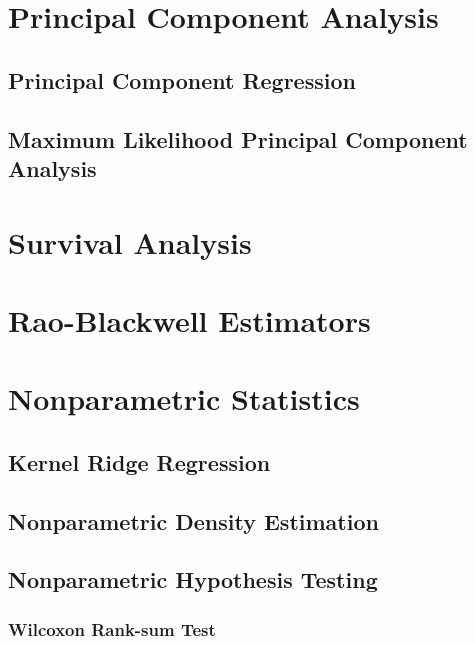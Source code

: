 \documentclass[11pt]{report} %
\begin{document}
\section{Principal Component Analysis}

\subsection{Principal Component Regression}

\subsection{Maximum Likelihood Principal Component Analysis \cite{Bishop2006}}

\section{Survival Analysis}

\section{Rao-Blackwell Estimators}

\section{Nonparametric Statistics}

\subsection{Kernel Ridge Regression}

\subsection{Nonparametric Density Estimation}

\subsection{Nonparametric Hypothesis Testing}

\subsubsection{Wilcoxon Rank-sum Test \cite{Hollander2014}}
\end{document}
